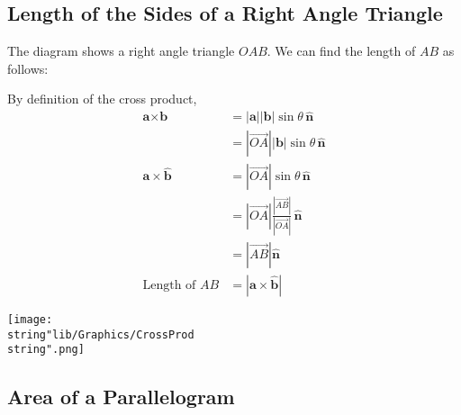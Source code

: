 \documentclass[11pt,a4paper]{book}
\begin{document}
\subsection{Length of the Sides of a Right Angle Triangle}

\begin{minipage}[t]{0.65\textwidth}

The diagram shows a right angle triangle $OAB$. We can find the length
of $AB$ as follows:

By definition of the cross product,
\begin{align*}
\textbf{a}\times\textbf{b} & =\left|\textbf{a}\right|\left|\textbf{b}\right|\sin\theta\,\hat{\textbf{n}}\\
 & =\left|\overrightarrow{OA}\right|\left|\textbf{b}\right|\sin\theta\,\hat{\textbf{n}}\\
\textbf{a}\times\hat{\textbf{b}} & =\left|\overrightarrow{OA}\right|\sin\theta\,\hat{\textbf{n}}\\
 & =\left|\overrightarrow{OA}\right|\frac{\left|\overrightarrow{AB}\right|}{\left|\overrightarrow{OA}\right|}\,\hat{\textbf{n}}\\
 & =\left|\overrightarrow{AB}\right|\hat{\textbf{n}}\\
\text{Length of }AB & =\left|\textbf{a}\times\hat{\textbf{b}}\right|
\end{align*}

\end{minipage}
\begin{minipage}[t]{0.2\textwidth}
\begin{center}
\texttt{[image: \\string"lib/Graphics/CrossProd\\string".png]}
\par\end{center}

\end{minipage}


\subsection{Area of a Parallelogram}
\end{document}
